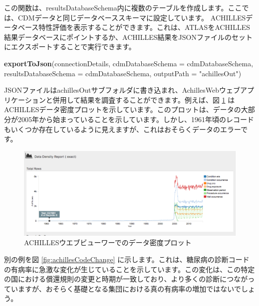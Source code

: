 \documentclass[
  11pt]{book}
\newenvironment{Shaded}{\begin{snugshade}}{\end{snugshade}}
\newcommand{\AttributeTok}[1]{\textcolor[rgb]{0.13,0.29,0.53}{#1}}
\newcommand{\FunctionTok}[1]{\textcolor[rgb]{0.13,0.29,0.53}{\textbf{#1}}}
\newcommand{\NormalTok}[1]{#1}
\newcommand{\StringTok}[1]{\textcolor[rgb]{0.31,0.60,0.02}{#1}}
\theoremstyle{definition}
\theoremstyle{definition}
\theoremstyle{definition}
\theoremstyle{definition}
\theoremstyle{remark}
\begin{document}
この関数は、resultsDatabaseSchema内に複数のテーブルを作成します。ここでは、CDMデータと同じデータベーススキーマに設定しています。 ACHILLESデータベース特性評価を表示することができます。これは、ATLASをACHILLES結果データベースにポイントするか、ACHILLES結果をJSONファイルのセットにエクスポートすることで実行できます。

\begin{Shaded}
\begin{Highlighting}[]
\FunctionTok{exportToJson}\NormalTok{(connectionDetails,}
             \AttributeTok{cdmDatabaseSchema =}\NormalTok{ cdmDatabaseSchema,}
             \AttributeTok{resultsDatabaseSchema =}\NormalTok{ cdmDatabaseSchema,}
             \AttributeTok{outputPath =} \StringTok{"achillesOut"}\NormalTok{)}
\end{Highlighting}
\end{Shaded}

JSONファイルはachillesOutサブフォルダに書き込まれ、AchillesWebウェブアプリケーションと併用して結果を調査することができます。例えば、図 \ref{fig:achillesDataDensity} はACHILLESデータ密度プロットを示しています。このプロットは、データの大部分が2005年から始まっていることを示しています。しかし、1961年頃のレコードもいくつか存在しているように見えますが、これはおそらくデータのエラーです。

\begin{figure}

{\centering \includegraphics[width=1\linewidth]{images/DataQuality/achillesDataDensity} 

}

\caption{ACHILLESウエブビューワーでのデータ密度プロット}\label{fig:achillesDataDensity}
\end{figure}

別の例を図 \ref{fig:achillesCodeChange} に示します。これは、糖尿病の診断コードの有病率に急激な変化が生じていることを示しています。この変化は、この特定の国における償還規則の変更と時期が一致しており、より多くの診断につながっていますが、おそらく基礎となる集団における真の有病率の増加ではないでしょう。
\end{document}
